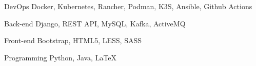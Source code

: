 

\begin{cvskills}

    \cvskill
    {DevOps} %
    {Docker, Kubernetes, Rancher, Podman, K3S, Ansible, Github Actions} %

    \cvskill
    {Back-end} %
    {Django, REST API, MySQL, Kafka, ActiveMQ} %

    \cvskill
    {Front-end} %
    {Bootstrap, HTML5, LESS, SASS} %

    \cvskill
    {Programming} %
    {Python, Java, LaTeX} %

\end{cvskills}
